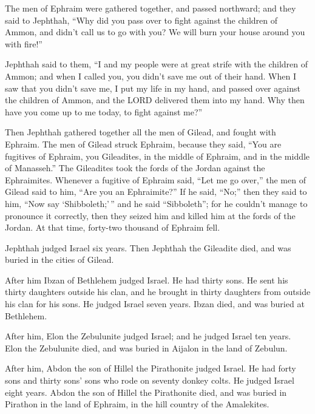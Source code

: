  The men of Ephraim were gathered together, and passed
northward; and they said to Jephthah, ``Why did you pass over to fight
against the children of Ammon, and didn't call us to go with you? We
will burn your house around you with fire!''

 Jephthah said to them, ``I and my people were at great
strife with the children of Ammon; and when I called you, you didn't
save me out of their hand.  When I saw that you didn't
save me, I put my life in my hand, and passed over against the children
of Ammon, and the LORD delivered them into my hand. Why then have you
come up to me today, to fight against me?''

 Then Jephthah gathered together all the men of Gilead,
and fought with Ephraim. The men of Gilead struck Ephraim, because they
said, ``You are fugitives of Ephraim, you Gileadites, in the middle of
Ephraim, and in the middle of Manasseh.''  The Gileadites
took the fords of the Jordan against the Ephraimites. Whenever a
fugitive of Ephraim said, ``Let me go over,'' the men of Gilead said to
him, ``Are you an Ephraimite?'' If he said, ``No;''  then
they said to him, ``Now say `Shibboleth;'\,'' and he said ``Sibboleth'';
for he couldn't manage to pronounce it correctly, then they seized him
and killed him at the fords of the Jordan. At that time, forty-two
thousand of Ephraim fell.

 Jephthah judged Israel six years. Then Jephthah the
Gileadite died, and was buried in the cities of Gilead.

 After him Ibzan of Bethlehem judged Israel.
 He had thirty sons. He sent his thirty daughters outside
his clan, and he brought in thirty daughters from outside his clan for
his sons. He judged Israel seven years.  Ibzan died, and
was buried at Bethlehem.

 After him, Elon the Zebulunite judged Israel; and he
judged Israel ten years.  Elon the Zebulunite died, and
was buried in Aijalon in the land of Zebulun.

 After him, Abdon the son of Hillel the Pirathonite
judged Israel.  He had forty sons and thirty sons' sons
who rode on seventy donkey colts. He judged Israel eight years.
 Abdon the son of Hillel the Pirathonite died, and was
buried in Pirathon in the land of Ephraim, in the hill country of the
Amalekites.

